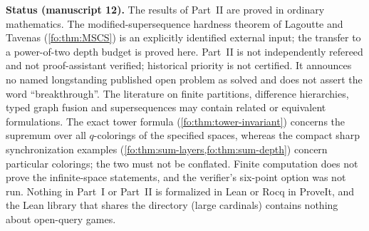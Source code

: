 \documentclass[11pt,letterpaper]{article}
\numberwithin{equation}{section}
\theoremstyle{definition}
\theoremstyle{remark}
\theoremstyle{definition}
\begin{document}
\begin{resultbox}
\textbf{Status (manuscript 12).} The results of Part~II are proved in ordinary
mathematics. The modified-supersequence hardness theorem of Lagoutte and
Tavenas (\cref{fo:thm:MSCS}) is an explicitly identified external input; the
transfer to a power-of-two depth budget is proved here. Part~II is not
independently refereed and not proof-assistant verified; historical priority
is not certified. It announces no named longstanding published open problem
as solved and does not assert the word ``breakthrough''. The literature on
finite partitions, difference hierarchies, typed graph fusion and
supersequences may contain related or equivalent formulations. The exact tower
formula (\cref{fo:thm:tower-invariant}) concerns the supremum over all
$q$-colorings of the specified spaces, whereas the compact sharp
synchronization examples (\cref{fo:thm:sum-layers,fo:thm:sum-depth}) concern
particular colorings; the two must not be conflated. Finite computation does
not prove the infinite-space statements, and the verifier's six-point option
was not run. Nothing in Part~I or Part~II is formalized in Lean or Rocq in
ProveIt, and the Lean library that shares the 
directory (large cardinals) contains nothing about open-query games.
\end{resultbox}
\end{document}
